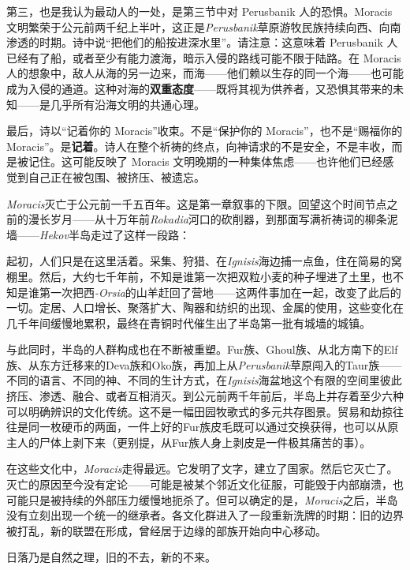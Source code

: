 第三，也是我认为最动人的一处，是第三节中对 Perusbanik 人的恐惧。Moracis 文明繁荣于公元前两千纪上半叶，这正是\textit{Perusbanik}草原游牧民族持续向西、向南渗透的时期。诗中说``把他们的船按进深水里''。请注意：这意味着 Perusbanik 人已经有了船，或者至少有能力渡海，暗示入侵的路线可能不限于陆路。在 Moracis 人的想象中，敌人从海的另一边来，而海——他们赖以生存的同一个海——也可能成为入侵的通道。这种对海的\textbf{双重态度}——既将其视为供养者，又恐惧其带来的未知——是几乎所有沿海文明的共通心理。

最后，诗以``记着你的 Moracis''收束。不是``保护你的 Moracis''，也不是``赐福你的 Moracis''。是\textbf{记着}。诗人在整个祈祷的终点，向神请求的不是安全，不是丰收，而是被记住。这可能反映了 Moracis 文明晚期的一种集体焦虑——也许他们已经感觉到自己正在被包围、被挤压、被遗忘。

\textit{Moracis}灭亡于公元前一千五百年。这是第一章叙事的下限。回望这个时间节点之前的漫长岁月——从十万年前\textit{Rokadia}河口的砍削器，到那面写满祈祷词的柳条泥墙——\textit{Hekov}半岛走过了这样一段路：

起初，人们只是在这里活着。采集、狩猎、在\textit{Ignisis}海边捕一点鱼，住在简易的窝棚里。然后，大约七千年前，不知是谁第一次把双粒小麦的种子埋进了土里，也不知是谁第一次把西\textit{-Orsia}的山羊赶回了营地——这两件事加在一起，改变了此后的一切。定居、人口增长、聚落扩大、陶器和纺织的出现、金属的使用，这些变化在几千年间缓慢地累积，最终在青铜时代催生出了半岛第一批有城墙的城镇。

与此同时，半岛的人群构成也在不断被重塑。Fur族、Ghoul族、从北方南下的Elf族、从东方迁移来的Deva族和Oko族，再加上从\textit{Perusbanik}草原闯入的Taur族——不同的语言、不同的神、不同的生计方式，在\textit{Ignisis}海盆地这个有限的空间里彼此挤压、渗透、融合、或者互相消灭。到公元前两千年前后，半岛上并存着至少六种可以明确辨识的文化传统。这不是一幅田园牧歌式的多元共存图景。贸易和劫掠往往是同一枚硬币的两面，一件上好的Fur族皮毛既可以通过交换获得，也可以从原主人的尸体上剥下来（更别提，从Fur族人身上剥皮是一件极其痛苦的事）。

在这些文化中，\textit{Moracis}走得最远。它发明了文字，建立了国家。然后它灭亡了。灭亡的原因至今没有定论——可能是被某个邻近文化征服，可能毁于内部崩溃，也可能只是被持续的外部压力缓慢地扼杀了。但可以确定的是，\textit{Moracis}之后，半岛没有立刻出现一个统一的继承者。各文化群进入了一段重新洗牌的时期：旧的边界被打乱，新的联盟在形成，曾经居于边缘的部族开始向中心移动。

日落乃是自然之理，旧的不去，新的不来。

